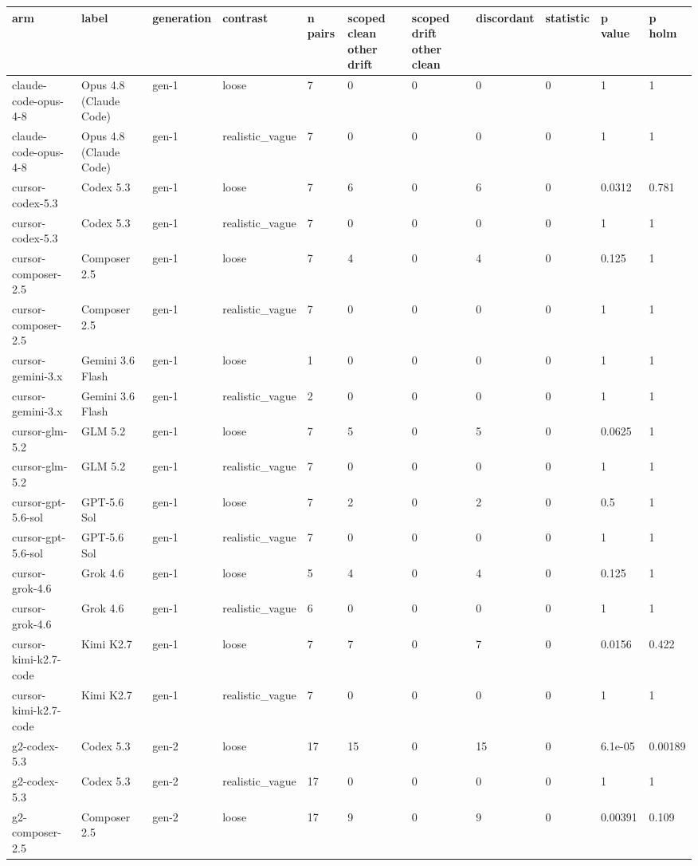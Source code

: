 \begin{tabular}{lllllllllll}
\toprule
arm & label & generation & contrast & n pairs & scoped clean other drift & scoped drift other clean & discordant & statistic & p value & p holm \\
\midrule
claude-code-opus-4-8 & Opus 4.8 (Claude Code) & gen-1 & loose & 7 & 0 & 0 & 0 & 0 & 1 & 1 \\
claude-code-opus-4-8 & Opus 4.8 (Claude Code) & gen-1 & realistic\_vague & 7 & 0 & 0 & 0 & 0 & 1 & 1 \\
cursor-codex-5.3 & Codex 5.3 & gen-1 & loose & 7 & 6 & 0 & 6 & 0 & 0.0312 & 0.781 \\
cursor-codex-5.3 & Codex 5.3 & gen-1 & realistic\_vague & 7 & 0 & 0 & 0 & 0 & 1 & 1 \\
cursor-composer-2.5 & Composer 2.5 & gen-1 & loose & 7 & 4 & 0 & 4 & 0 & 0.125 & 1 \\
cursor-composer-2.5 & Composer 2.5 & gen-1 & realistic\_vague & 7 & 0 & 0 & 0 & 0 & 1 & 1 \\
cursor-gemini-3.x & Gemini 3.6 Flash & gen-1 & loose & 1 & 0 & 0 & 0 & 0 & 1 & 1 \\
cursor-gemini-3.x & Gemini 3.6 Flash & gen-1 & realistic\_vague & 2 & 0 & 0 & 0 & 0 & 1 & 1 \\
cursor-glm-5.2 & GLM 5.2 & gen-1 & loose & 7 & 5 & 0 & 5 & 0 & 0.0625 & 1 \\
cursor-glm-5.2 & GLM 5.2 & gen-1 & realistic\_vague & 7 & 0 & 0 & 0 & 0 & 1 & 1 \\
cursor-gpt-5.6-sol & GPT-5.6 Sol & gen-1 & loose & 7 & 2 & 0 & 2 & 0 & 0.5 & 1 \\
cursor-gpt-5.6-sol & GPT-5.6 Sol & gen-1 & realistic\_vague & 7 & 0 & 0 & 0 & 0 & 1 & 1 \\
cursor-grok-4.6 & Grok 4.6 & gen-1 & loose & 5 & 4 & 0 & 4 & 0 & 0.125 & 1 \\
cursor-grok-4.6 & Grok 4.6 & gen-1 & realistic\_vague & 6 & 0 & 0 & 0 & 0 & 1 & 1 \\
cursor-kimi-k2.7-code & Kimi K2.7 & gen-1 & loose & 7 & 7 & 0 & 7 & 0 & 0.0156 & 0.422 \\
cursor-kimi-k2.7-code & Kimi K2.7 & gen-1 & realistic\_vague & 7 & 0 & 0 & 0 & 0 & 1 & 1 \\
g2-codex-5.3 & Codex 5.3 & gen-2 & loose & 17 & 15 & 0 & 15 & 0 & 6.1e-05 & 0.00189 \\
g2-codex-5.3 & Codex 5.3 & gen-2 & realistic\_vague & 17 & 0 & 0 & 0 & 0 & 1 & 1 \\
g2-composer-2.5 & Composer 2.5 & gen-2 & loose & 17 & 9 & 0 & 9 & 0 & 0.00391 & 0.109 \\

\end{tabular}
